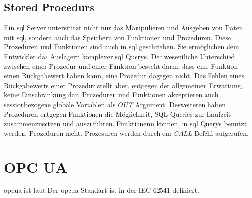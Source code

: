 \subsection{Stored Procedurs}\label{subsec:storedProc}
Ein \ac{sql} Server unterstützt nicht nur das Manipulieren und Ausgeben von Daten mit \ac{sql}, sondern auch das Speichern von Funktionen und Prozeduren.
Diese Prozeduren und Funktionen sind auch in \ac{sql} geschrieben.
Sie ermöglichen dem Entwickler das Auslagern komplexer \ac{sql} Querys.
Der wesentliche Unterschied zwischen einer Prozedur und einer Funktion besteht darin, dass eine Funktion einen Rückgabewert haben kann, eine Prozedur dagegen nicht.
Das Fehlen eines Rückgabewerts einer Prozedur stellt aber, entgegen der allgemeinen Erwartung, keine Einschränkung dar. 
Prozeduren und Funktionen akzeptieren auch sessionbezogene globale Variablen als \emph{OUT} Argument. 
Desweiteren haben Prozeduren entgegen Funktionen die Möglichkeit, SQL-Queries zur Laufzeit zusammenzusetzen und auszuführen.
Funktionenn können, in \ac{sql} Querys benutzt werden, Prozeduren nicht.
Prozesuren werden durch ein \emph{CALL} Befehl aufgerufen.


\section{OPC UA}
\ac{opcua} ist laut 
Der \ac{opcua} Standart ist in der IEC 62541 definiert.

